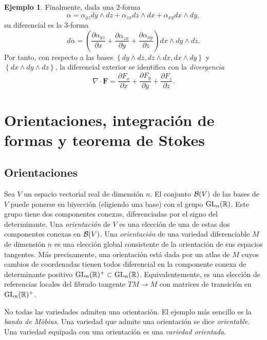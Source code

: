 \documentclass[11pt,a4paper]{amsbook}
\theoremstyle{remark} \newtheorem{rmk}[subsection]{Observación}
\theoremstyle{definition} \newtheorem{defn}[subsection]{Definición}
\theoremstyle{definition} \newtheorem{ex}[subsection]{Ejemplo}
\theoremstyle{definition} \newtheorem{ej}[subsection]{Ejercicio}
\begin{document}
\begin{ex}
Finalmente, dada una $2$-forma
\begin{equation*}
\alpha = \alpha_{yz} dy\wedge dz + \alpha_{zx} dz\wedge dx + \alpha_{xy} dx\wedge dy,
\end{equation*}
su diferencial es la $3$-forma
\begin{equation*}
d\alpha = \left( \frac{\partial \alpha_{yz}}{\partial x} + \frac{\partial \alpha_{zx}}{\partial y} + \frac{\partial \alpha_{xy}}{\partial z} \right) dx\wedge dy \wedge dz.
\end{equation*}
Por tanto, con respecto a las bases $\left\{ dy\wedge dz, dz\wedge dx,dx \wedge dy \right\}$ y $\left\{ dx\wedge dy \wedge dz \right\}$, la diferencial exterior se identifica con la \emph{divergencia}
\begin{equation*}
\nabla \cdot \bm{F} = \frac{\partial F_{x}}{\partial x} + \frac{\partial F_{y}}{\partial y} + \frac{\partial F_{z}}{\partial z} .
\end{equation*}
\end{ex}

\section{Orientaciones, integración de formas y teorema de Stokes}
\subsection{Orientaciones} Sea $V$ un espacio vectorial real de dimensión $n$. El conjunto $\mathcal B(V)$ de las bases de $V$ puede ponerse en biyección (eligiendo una base) con el grupo $\operatorname{GL}_n(\mathbb R)$. Este grupo tiene dos componentes conexas, diferenciadas por el signo del determinante. Una \emph{orientación} de $V$ es una elección de una de estas dos componentes conexas en $\mathcal B(V)$. Una \emph{orientación} de una variedad diferenciable $M$ de dimensión $n$ es una elección global consistente de la orientación de sus espacios tangentes. Más precisamente, una orientación está dada por un atlas de $M$ cuyos cambios de coordenadas tienen todos diferencial en la componente conexa de determinante positivo $\operatorname{GL}_n(\mathbb R)^+ \subset \operatorname{GL}_n(\mathbb R)$. Equivalentemente, es una elección de referencias locales del fibrado tangente $TM\rightarrow M$ con matrices de transición en $\operatorname{GL}_n(\mathbb R)^+$.

No todas las variedades admiten una orientación. El ejemplo más sencillo es la \emph{banda de Möbius}. Una variedad que admite una orientación se dice \emph{orientable}. Una variedad equipada con una orientación es una \emph{variedad orientada}.
\end{document}
